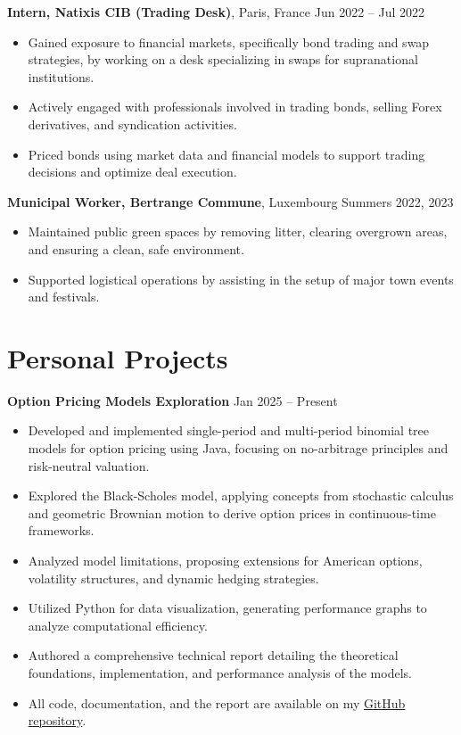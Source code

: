 \documentclass[10pt, letterpaper]{article}
\newenvironment{highlights}{
    \begin{itemize}[topsep=0.10cm, parsep=0.10cm, partopsep=0pt, itemsep=0pt, leftmargin=10pt]
}{
    \end{itemize}
}
\begin{document}
\textbf{Intern, Natixis CIB (Trading Desk)}, Paris, France \hfill Jun 2022 -- Jul 2022 \\
\begin{highlights}
    \item Gained exposure to financial markets, specifically bond trading and swap strategies, by working on a desk specializing in swaps for supranational institutions.
    \item Actively engaged with professionals involved in trading bonds, selling Forex derivatives, and syndication activities.
    \item Priced bonds using market data and financial models to support trading decisions and optimize deal execution.
\end{highlights}

\textbf{Municipal Worker, Bertrange Commune}, Luxembourg \hfill Summers 2022, 2023 \\
\begin{highlights}
    \item Maintained public green spaces by removing litter, clearing overgrown areas, and ensuring a clean, safe environment.
    \item Supported logistical operations by assisting in the setup of major town events and festivals.
\end{highlights}

\section{Personal Projects}
\textbf{Option Pricing Models Exploration} \hfill Jan 2025 -- Present \\
\begin{highlights}
    \item Developed and implemented single-period and multi-period binomial tree models for option pricing using Java, focusing on no-arbitrage principles and risk-neutral valuation.
    \item Explored the Black-Scholes model, applying concepts from stochastic calculus and geometric Brownian motion to derive option prices in continuous-time frameworks.
    \item Analyzed model limitations, proposing extensions for American options, volatility structures, and dynamic hedging strategies.
    \item Utilized Python for data visualization, generating performance graphs to analyze computational efficiency.
    \item Authored a comprehensive technical report detailing the theoretical foundations, implementation, and performance analysis of the models.
    \item All code, documentation, and the report are available on my \href{https://github.com/tombeauge}{GitHub repository}.
\end{highlights} 
\end{document}
